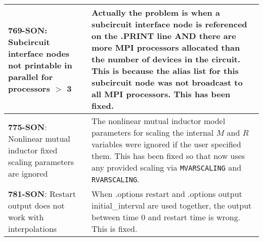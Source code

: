 {\begin{longtable}[h] {>{\raggedright\small}m{2in}|>{\raggedright\let\\\tabularnewline\small}m{3.5in}}
     \textbf{769-SON}: Subcircuit interface nodes not printable in parallel for processors $>$ 3 &
     Actually the problem is when a subcircuit interface node is referenced on the .PRINT line
     AND there are more MPI processors allocated than the number of devices in the circuit.  
     This is because the alias list for this subcircuit node was not broadcast to all MPI processors.
     This has been fixed.
     
     \\ \hline
     \textbf{775-SON}: Nonlinear mutual inductor fixed scaling parameters are ignored &
     The nonlinear mutual inductor model parameters for scaling the internal $M$ and $R$ 
     variables were ignored if the user specified them.  This has been fixed so that 
     \Xyce{} now uses any provided scaling via \texttt{MVARSCALING} and \texttt{RVARSCALING}.
     \\ \hline
     
   \textbf{781-SON}: Restart output does not work with interpolations & When .options restart
     and .options output initial\_interval are used together, the output between time 0 and restart time is wrong.
     This is fixed.
     \\ \hline

\end{longtable}
}
